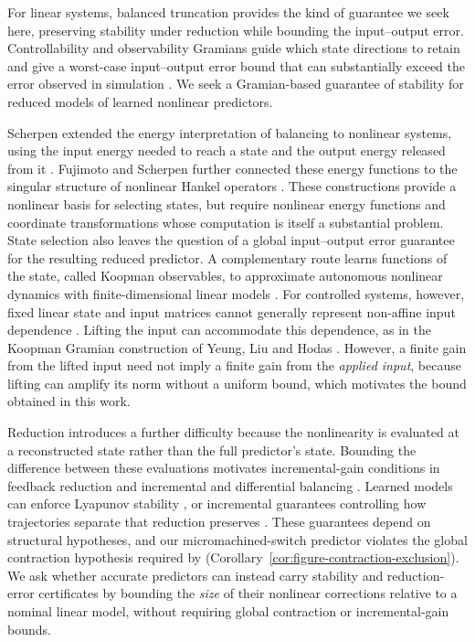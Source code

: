 \documentclass{l4dc2027}
\begin{document}
For linear systems, balanced truncation provides the kind of guarantee we seek here, preserving stability under reduction while bounding the input--output error.
Controllability and observability Gramians guide which state directions to retain and give a worst-case input--output error bound that can substantially exceed the error observed in simulation \citep{antoulas}.
We seek a Gramian-based guarantee of stability for reduced models of learned nonlinear predictors.

Scherpen extended the energy interpretation of balancing to nonlinear systems, using the input energy needed to reach a state and the output energy released from it \citep{scherpen}.
Fujimoto and Scherpen further connected these energy functions to the singular structure of nonlinear Hankel operators \citep{fujimoto}.
These constructions provide a nonlinear basis for selecting states, but require nonlinear energy functions and coordinate transformations whose computation is itself a substantial problem.
State selection also leaves the question of a global input--output error guarantee for the resulting reduced predictor.
A complementary route learns functions of the state, called Koopman observables, to approximate autonomous nonlinear dynamics with finite-dimensional linear models \citep{koopman,mezic,williams-edmd,lusch}.
For controlled systems, however, fixed linear state and input matrices cannot generally represent non-affine input dependence \citep{haseli}.
Lifting the input can accommodate this dependence, as in the Koopman Gramian construction of Yeung, Liu and Hodas \citep{yeung}.
However, a finite gain from the lifted input need not imply a finite gain from the \emph{applied input}, because lifting can amplify its norm without a uniform bound, which motivates the bound obtained in this work.

Reduction introduces a further difficulty because the nonlinearity is evaluated at a reconstructed state rather than the full predictor's state.
Bounding the difference between these evaluations motivates incremental-gain conditions in feedback reduction \citep{besselink-feedback} and incremental and differential balancing \citep{besselink-incremental,kawano-scherpen}.
Learned models can enforce Lyapunov stability \citep{manek-kolter}, or incremental guarantees controlling how trajectories separate that reduction preserves \citep{ren,shakib-ren,abbasi}.
These guarantees depend on structural hypotheses, and our micromachined-switch predictor violates the global contraction hypothesis required by \citet{shakib-ren} (Corollary~\ref{cor:figure-contraction-exclusion}).
We ask whether accurate predictors can instead carry stability and reduction-error certificates by bounding the \emph{size} of their nonlinear corrections relative to a nominal linear model, without requiring global contraction or incremental-gain bounds.
\end{document}
